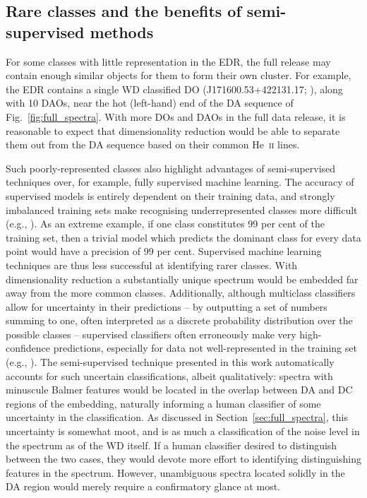 \documentclass[fleqn,usenatbib]{mnras}
\begin{document}
\subsection{Rare classes and the benefits of semi-supervised methods}
\label{sec:rare}

For some classes with little representation in the EDR, the full release may contain enough similar objects for them to form their own cluster.
For example, the EDR contains a single WD classified DO (J171600.53+422131.17; \citealt{manser24}), along with 10 DAOs, near the hot (left-hand) end of the DA sequence of Fig.~\ref{fig:full_spectra}.
With more DOs and DAOs in the full data release, it is reasonable to expect that dimensionality reduction would be able to separate them out from the DA sequence based on their common He~\textsc{ii} lines.

Such poorly-represented classes also highlight advantages of semi-supervised techniques over, for example, fully supervised machine learning.
The accuracy of supervised models is entirely dependent on their training data, and strongly imbalanced training sets make recognising underrepresented classes more difficult (e.g., \citealt{he09, johnson19, das23}).
As an extreme example, if one class constitutes 99 per cent of the training set, then a trivial model which predicts the dominant class for every data point would have a precision of 99 per cent.
Supervised machine learning techniques are thus less successful at identifying rarer classes.
With dimensionality reduction a substantially unique spectrum would be embedded far away from the more common classes.
Additionally, although multiclass classifiers allow for uncertainty in their predictions -- by outputting a set of numbers summing to one, often interpreted as a discrete probability distribution over the possible classes -- supervised classifiers often erroneously make very high-confidence predictions, especially for data not well-represented in the training set (e.g., \citealt{nguyen15, guo17, hein19}).
The semi-supervised technique presented in this work automatically accounts for such uncertain classifications, albeit qualitatively: spectra with minuscule Balmer features would be located in the overlap between DA and DC regions of the embedding, naturally informing a human classifier of some uncertainty in the classification.
As discussed in Section~\ref{sec:full_spectra}, this uncertainty is somewhat moot, and is as much a classification of the noise level in the spectrum as of the WD itself.
If a human classifier desired to distinguish between the two cases, they would devote more effort to identifying distinguishing features in the spectrum.
However, unambiguous spectra located solidly in the DA region would merely require a confirmatory glance at most.
\end{document}
